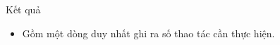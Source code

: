 Kết quả  
\begin{itemize}
	\item     Gồm một dòng duy nhất ghi ra số thao tác cần thực hiện.   
\end{itemize}